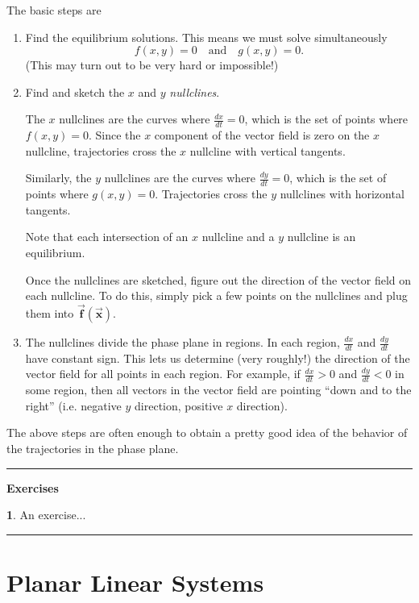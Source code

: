 \documentclass[reqno]{immbook}
\newcommand{\BF}{\vec{\textbf{f}}}
\newcommand{\BX}{\vec{\textbf{x}}}
\numberwithin{equation}{chapter}
\numberwithin{question}{section}
\numberwithin{theorem}{chapter}
\numberwithin{figure}{chapter}
\theoremstyle{definition}
\newtheorem{exercise}{}[section]
\newenvironment{exercises}%
{%
\medskip\hrule\medskip\noindent\textbf{Exercises}%
}%
{%
\medskip\hrule
}
\begin{document}
The basic steps are
\begin{enumerate}
\item Find the equilibrium solutions.
This means we must solve simultaneously
\begin{equation}
    f(x,y) = 0 \quad \textrm{and} \quad g(x,y) =0.
\end{equation}
(This may turn out to be very hard or impossible!)
\item Find and sketch the $x$ and $y$ \emph{nullclines}.

The $x$ nullclines are the curves where $\frac{dx}{dt}=0$, which
is the set of points where $f(x,y)=0$.
Since the $x$ component of the vector field is zero on the
$x$ nullcline, trajectories cross the $x$ nullcline with
vertical tangents.

Similarly, the $y$ nullclines are the curves where
$\frac{dy}{dt} = 0$, which is the set of points where $g(x,y) = 0$.
Trajectories cross the $y$ nullclines with horizontal tangents.

Note that each intersection of an $x$ nullcline and a $y$ nullcline
is an equilibrium.

Once the nullclines are sketched, figure out the direction of the
vector field on each nullcline. To do this, simply pick a few points
on the nullclines and plug them into $\BF(\BX)$.

\item
The nullclines divide the phase plane in regions.  In each
region, $\frac{dx}{dt}$ and $\frac{dy}{dt}$ have constant sign.
This lets us determine (very roughly!) the direction of the
vector field for all points in each region.  For example,
if $\frac{dx}{dt} > 0$ and $\frac{dy}{dt} < 0$ in some region,
then all vectors in the vector field are pointing
``down and to the right'' (i.e. negative $y$ direction,
positive $x$ direction).
\end{enumerate}
The above steps are often enough to obtain a
pretty good idea of the behavior of the trajectories
in the phase plane.

\begin{exercises}
\begin{exercise}
An exercise...
\end{exercise}
\end{exercises}
%
%
\newpage

\section{Planar Linear Systems}
\end{document}
